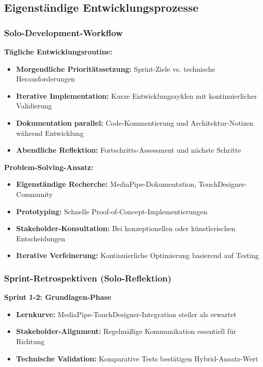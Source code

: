 \subsection{Eigenständige Entwicklungsprozesse}

\subsubsection{Solo-Development-Workflow}

\textbf{Tägliche Entwicklungsroutine:}
\begin{itemize}
    \item \textbf{Morgendliche Prioritätssetzung:} Sprint-Ziele vs. technische Herausforderungen
    \item \textbf{Iterative Implementation:} Kurze Entwicklungszyklen mit kontinuierlicher Validierung
    \item \textbf{Dokumentation parallel:} Code-Kommentierung und Architektur-Notizen während Entwicklung
    \item \textbf{Abendliche Reflektion:} Fortschritts-Assessment und nächste Schritte
\end{itemize}

\textbf{Problem-Solving-Ansatz:}
\begin{itemize}
    \item \textbf{Eigenständige Recherche:} MediaPipe-Dokumentation, TouchDesigner-Community
    \item \textbf{Prototyping:} Schnelle Proof-of-Concept-Implementierungen
    \item \textbf{Stakeholder-Konsultation:} Bei konzeptionellen oder künstlerischen Entscheidungen
    \item \textbf{Iterative Verfeinerung:} Kontinuierliche Optimierung basierend auf Testing
\end{itemize}

\subsubsection{Sprint-Retrospektiven (Solo-Reflektion)}

\textbf{Sprint 1-2: Grundlagen-Phase}
\begin{itemize}
    \item \textbf{Lernkurve:} MediaPipe-TouchDesigner-Integration steiler als erwartet
    \item \textbf{Stakeholder-Alignment:} Regelmäßige Kommunikation essentiell für Richtung
    \item \textbf{Technische Validation:} Komparative Tests bestätigen Hybrid-Ansatz-Wert
\end{itemize}

